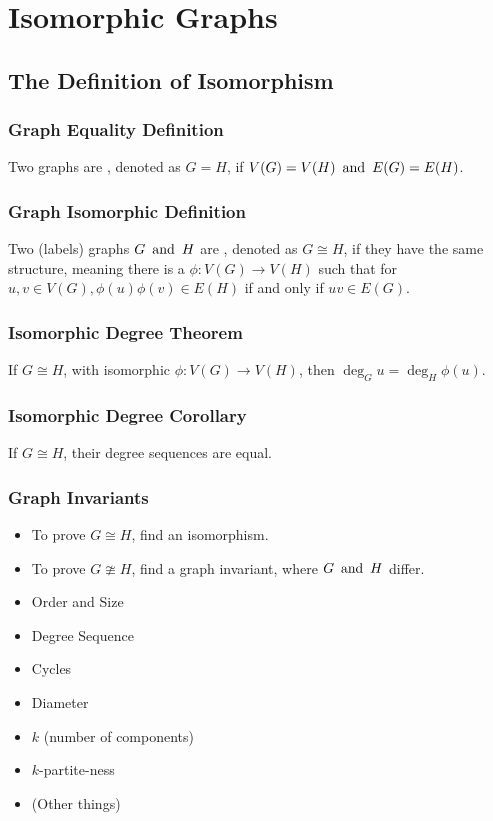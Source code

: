 \section{Isomorphic Graphs}

\subsection{The Definition of Isomorphism}

\subsubsection*{Graph Equality Definition}
Two graphs are , denoted as $G = H$, if $V(G) = V(H) \operatorname{~\text{and}~} E(G) = E(H)$.

\subsubsection*{Graph Isomorphic Definition}
Two (labels) graphs $G \operatorname{~\text{and}~} H$ are , denoted as $G \cong H$, if they have the same structure, meaning there is a  $\phi: V(G) \to V(H)$ such that for $u,v \in V(G), \phi(u)\phi(v) \in E(H)$ if and only if $uv \in E(G)$.

\subsubsection*{Isomorphic Degree Theorem}
If $G \cong H$, with isomorphic $\phi: V(G) \to V(H)$, then $\deg_G u = \deg_H \phi(u)$.

\subsubsection*{Isomorphic Degree Corollary}
If $G \cong H$, their degree sequences are equal.

\subsubsection*{Graph Invariants}
\begin{itemize}
    \item To prove $G \cong H$, find an isomorphism.
    \item To prove $G \ncong H$, find a graph invariant, where $G \operatorname{~\text{and}~} H$ differ.
\end{itemize}
\begin{itemize}
    \item Order and Size
    \item Degree Sequence
    \item Cycles
    \item Diameter
    \item $k$ (number of components)
    \item $k$-partite-ness
    \item (Other things)
\end{itemize}

